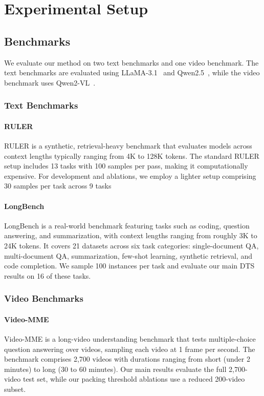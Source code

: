 \section{Experimental Setup}

\subsection{Benchmarks}

We evaluate our method on two text benchmarks and one video benchmark. The text benchmarks are evaluated using LLaMA-3.1~\cite{dubey2024llama3} and Qwen2.5~\cite{qwen25}, while the video benchmark uses Qwen2-VL~\cite{Qwen2-VL}.

\subsubsection{Text Benchmarks}

\paragraph{RULER}
RULER is a synthetic, retrieval-heavy benchmark that evaluates models across context lengths typically ranging from 4K to 128K tokens. The standard RULER setup includes 13 tasks with 100 samples per pass, making it computationally expensive. For development and ablations, we employ a lighter setup comprising 30 samples per task across 9 tasks

\paragraph{LongBench}
LongBench is a real-world benchmark featuring tasks such as coding, question answering, and summarization, with context lengths ranging from roughly 3K to 24K tokens. It covers 21 datasets across six task categories: single-document QA, multi-document QA, summarization, few-shot learning, synthetic retrieval, and code completion. We sample 100 instances per task and evaluate our main DTS results on 16 of these tasks.

\subsubsection{Video Benchmarks}

\paragraph{Video-MME}
Video-MME is a long-video understanding benchmark that tests multiple-choice question answering over videos, sampling each video at 1 frame per second. The benchmark comprises 2,700 videos with durations ranging from short (under 2 minutes) to long (30 to 60 minutes). Our main results evaluate the full 2,700-video test set, while our packing threshold ablations use a reduced 200-video subset.

